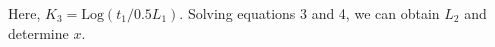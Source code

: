 \documentclass[a4paper,fleqn,usenatbib]{mnras}
\begin{document}
Here, $K_3=\mathrm{Log}(t_1/0.5{L_1})$.                                                                                                                                                                                                                                                                                                                                                                                                                                                                                                                                                                                                                                                                                                                                                                                                                                                                                                                                                                                                                                                                                                                                                                                                                                                                                                                                                                                                                                                                                                                                                                                                                                                                                                                                Solving equations 3 and 4, we can obtain ${L_2}$ and determine $x$.
\end{document}
